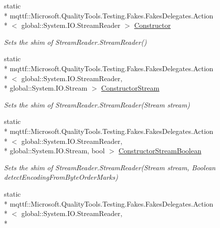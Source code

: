 \begin{DoxyCompactItemize}
static \\*
mqttf\-::\-Microsoft.\-Quality\-Tools.\-Testing.\-Fakes.\-Fakes\-Delegates.\-Action\\*
$<$ global\-::\-System.\-I\-O.\-Stream\-Reader $>$ \hyperlink{class_system_1_1_i_o_1_1_fakes_1_1_shim_stream_reader_a1fc96898402f133c74b14ff9b3f0d910}{Constructor}
\begin{DoxyCompactList}\small\item\em Sets the shim of Stream\-Reader.\-Stream\-Reader()\end{DoxyCompactList}\item 
static \\*
mqttf\-::\-Microsoft.\-Quality\-Tools.\-Testing.\-Fakes.\-Fakes\-Delegates.\-Action\\*
$<$ global\-::\-System.\-I\-O.\-Stream\-Reader, \\*
global\-::\-System.\-I\-O.\-Stream $>$ \hyperlink{class_system_1_1_i_o_1_1_fakes_1_1_shim_stream_reader_a78a50cb5bf04642828ce6750251c806d}{Constructor\-Stream}
\begin{DoxyCompactList}\small\item\em Sets the shim of Stream\-Reader.\-Stream\-Reader(\-Stream stream)\end{DoxyCompactList}\item 
static \\*
mqttf\-::\-Microsoft.\-Quality\-Tools.\-Testing.\-Fakes.\-Fakes\-Delegates.\-Action\\*
$<$ global\-::\-System.\-I\-O.\-Stream\-Reader, \\*
global\-::\-System.\-I\-O.\-Stream, bool $>$ \hyperlink{class_system_1_1_i_o_1_1_fakes_1_1_shim_stream_reader_a20b8490785bde7ff5cd4ef1ac9749a06}{Constructor\-Stream\-Boolean}
\begin{DoxyCompactList}\small\item\em Sets the shim of Stream\-Reader.\-Stream\-Reader(\-Stream stream, Boolean detect\-Encoding\-From\-Byte\-Order\-Marks)\end{DoxyCompactList}\item 
static \\*
mqttf\-::\-Microsoft.\-Quality\-Tools.\-Testing.\-Fakes.\-Fakes\-Delegates.\-Action\\*
$<$ global\-::\-System.\-I\-O.\-Stream\-Reader, \\*

\end{DoxyCompactItemize}
